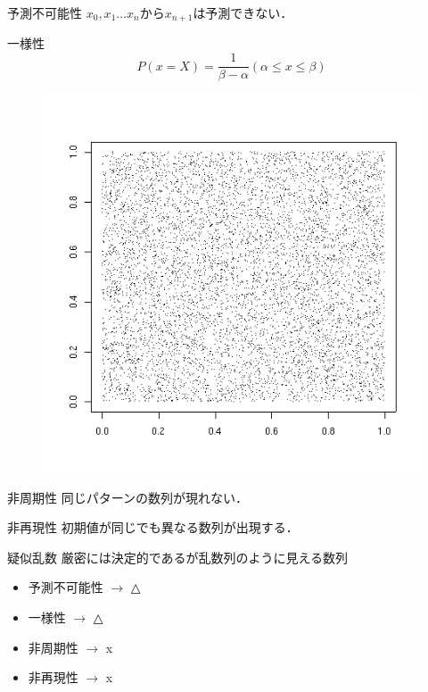\documentclass[dvipdfmx,xcolor={svgnames},17pt]{beamer}
\begin{document}
  \begin{frame}{予測不可能性}
    $x_0,x_1\ldots x_n$から$x_{n+1}$は予測できない．
  \end{frame}

    \begin{frame}{一様性}
      \begin{equation}
        P(x=X) = \frac{1}{\beta - \alpha} (\alpha \leq x \leq \beta)
      \end{equation}
      \begin{figure}[htbp]
        \centering
        \includegraphics[scale=0.3]{MTrand.png}
      \end{figure}
    \end{frame}

    \begin{frame}{非周期性}
      同じパターンの数列が現れない．
    \end{frame}

    \begin{frame}{非再現性}
      初期値が同じでも異なる数列が出現する．
    \end{frame}

    \begin{frame}{疑似乱数}
      厳密には決定的であるが乱数列のように見える数列
      \begin{itemize}
        \item 予測不可能性 $\rightarrow$ △
        \item 一様性 $\rightarrow$ △
        \item 非周期性 $\rightarrow$ x
        \item 非再現性 $\rightarrow$ x
      \end{itemize}
    \end{frame}
\end{document}
